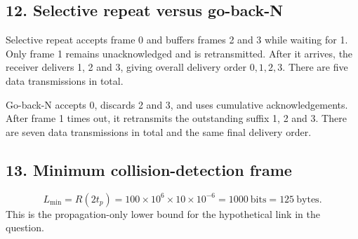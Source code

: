 \documentclass[11pt,a4paper]{article}
\begin{document}
\noindent\begin{minipage}{\linewidth}\subsection*{12. Selective repeat versus go-back-N}

Selective repeat accepts frame 0 and buffers frames 2 and 3 while waiting for 1. Only frame 1 remains unacknowledged and is retransmitted. After it arrives, the receiver delivers 1, 2 and 3, giving overall delivery order $0,1,2,3$. There are five data transmissions in total.

Go-back-N accepts 0, discards 2 and 3, and uses cumulative acknowledgements. After frame 1 times out, it retransmits the outstanding suffix 1, 2 and 3. There are seven data transmissions in total and the same final delivery order.
\end{minipage}\par\medskip
\noindent\begin{minipage}{\linewidth}\subsection*{13. Minimum collision-detection frame}

\[L_{\min}=R(2t_p)=100\times10^6\times10\times10^{-6}
=\boxed{1000\ \mathrm{bits}=125\ \mathrm{bytes}}.\]
This is the propagation-only lower bound for the hypothetical link in the question.
\end{minipage}\par\medskip
\end{document}
